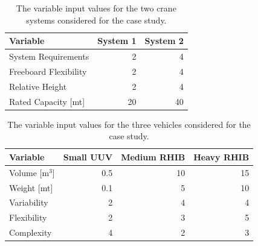 \documentclass{svproc}
\begin{document}
\begin{table}[!htb]
\begin{center}
\caption{The variable input values for the two crane systems considered for the case study.}
\begin{tabular}{l r r}
\hline
Variable              & System 1 & System 2 \\
\hline
System Requirements   & 2        & 4        \\
Freeboard Flexibility & 2        & 4        \\
Relative Height       & 2        & 4        \\
Rated Capacity [mt]   & 20       & 40       \\
\hline
\end{tabular}
\label{table:case_cranes}
\end{center}
\end{table}

\begin{table}[!htb]
\begin{center}
\caption{The variable input values for the three vehicles considered for the case study.}
\begin{tabular}{l r r r}
\hline
Variable        & Small UUV & Medium RHIB & Heavy RHIB \\
\hline
Volume {[m$^3$]}& 0.5       & 10          & 15         \\
Weight {[mt]}   & 0.1       & 5           & 10         \\
Variability     & 2         & 4           & 4          \\
Flexibility     & 2         & 3           & 5          \\
Complexity      & 4         & 2           & 3          \\
\hline
\end{tabular}
\label{table:case_vehicles}
\end{center}
\end{table}
\end{document}
